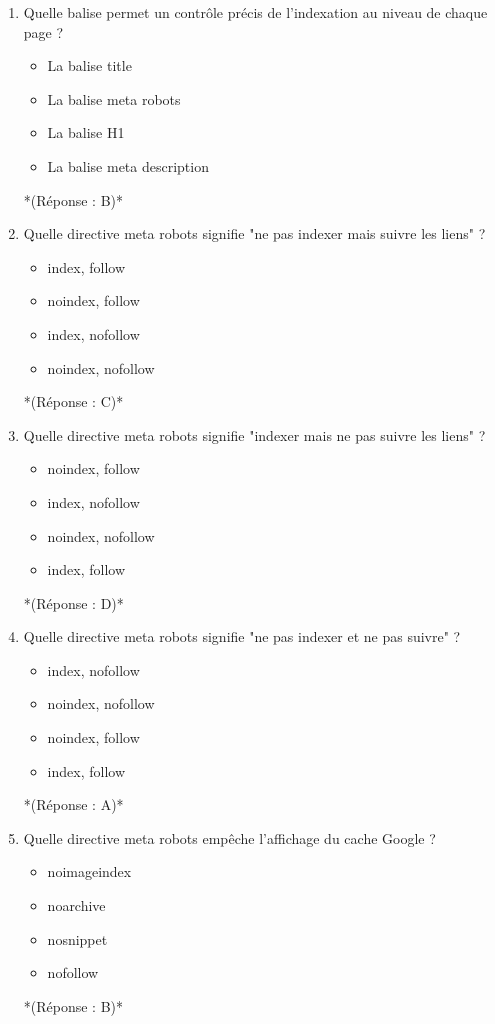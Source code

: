 \documentclass[12pt,a4paper,twoside]{report}
\begin{document}
\begin{enumerate}
\item Quelle balise permet un contrôle précis de l'indexation au niveau de chaque page ?
\begin{itemize}
\item[A)] La balise title
\item[B)] La balise meta robots
\item[C)] La balise H1
\item[D)] La balise meta description
\end{itemize}
*(Réponse : B)*

\item Quelle directive meta robots signifie "ne pas indexer mais suivre les liens" ?
\begin{itemize}
\item[A)] index, follow
\item[B)] noindex, follow
\item[C)] index, nofollow
\item[D)] noindex, nofollow
\end{itemize}
*(Réponse : C)*

\item Quelle directive meta robots signifie "indexer mais ne pas suivre les liens" ?
\begin{itemize}
\item[A)] noindex, follow
\item[B)] index, nofollow
\item[C)] noindex, nofollow
\item[D)] index, follow
\end{itemize}
*(Réponse : D)*

\item Quelle directive meta robots signifie "ne pas indexer et ne pas suivre" ?
\begin{itemize}
\item[A)] index, nofollow
\item[B)] noindex, nofollow
\item[C)] noindex, follow
\item[D)] index, follow
\end{itemize}
*(Réponse : A)*

\item Quelle directive meta robots empêche l'affichage du cache Google ?
\begin{itemize}
\item[A)] noimageindex
\item[B)] noarchive
\item[C)] nosnippet
\item[D)] nofollow
\end{itemize}
*(Réponse : B)*


\end{enumerate}
\end{document}

